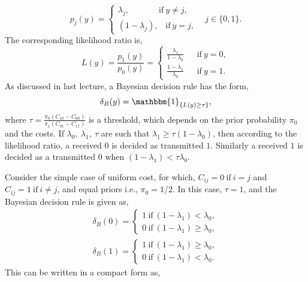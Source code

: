 \documentclass[a4paper,english,12pt]{article}
\begin{document}
\begin{exmp}
\begin{equation}
p_{j}\left( y\right) =\begin{cases}
 \lambda_{j} ,\hspace{42pt}\mbox{if}~y\neq j,\\
 \left( 1-\lambda_{j}\right),\hspace{10pt}\mbox{if}~ y=j,
\end{cases}
\hspace{10pt}j \in \{0,1\}.
\end{equation}
The corresponding likelihood ratio is,
\begin{equation}
L(y) = \frac{p_1(y)}{p_0(y)} = 
\begin{cases}
	\frac{\lambda_1}{1-\lambda_0} ~~~~~~~\mbox{if}~ y=0, \\
	 \frac{1-\lambda_1}{\lambda_0} ~~~~~~~\mbox{if}~ y=1.
\end{cases}
\end{equation}
As discussed in last lecture, a Bayesian decision rule has the form,
\begin{equation}
\delta_B(y)=\mathbbm{1}_{\{L(y)\geq \tau\}},
\end{equation}
where $\tau= \frac{\pi_0(C_{10}-C_{00})}{\pi_1(C_{01}-C_{11})}$ is a threshold, which depends on the prior probability $\pi_0$ and the costs. If $\lambda_0,~\lambda_1,~\tau$  are such that $\lambda_1\geq \tau\left( 1-\lambda_0\right) $, then according to the likelihood ratio, a received $0$ is decided as transmitted $1$. Similarly a received $1$ is decided as a transmitted $0$ when $(1-\lambda_1)<\tau \lambda_0$.
\par Consider the simple case of uniform cost, for which, $C_{ij} = 0~ \mbox{if}~ i=j$ and $C_{ij} = 1~ \mbox{if} ~i\neq j$, and equal priors i.e.,  $\pi_0=1/2$. In this case, $\tau=1$, and the Bayesian decision rule is given as,
\begin{eqnarray}
\delta_{B}(0)=
\begin{cases}
1~\mbox{if}~(1-\lambda_1)<\lambda_0,\\ 
0~\mbox{if}~(1-\lambda_1)\geq\lambda_0,
\end{cases}\\ \nonumber
\delta_{B}(1)=\begin{cases}
1~\mbox{if}~(1-\lambda_1)\geq\lambda_0,\\
0~\mbox{if}~(1-\lambda_1)<\lambda_0.
\end{cases}
\end{eqnarray}
This can be written in a compact form as,
\begin{equation}

\end{equation}
\end{exmp}
\end{document}
